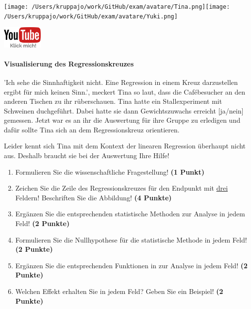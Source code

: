 \documentclass[a4paper, 9pt]{scrartcl}\usepackage[]{graphicx}\usepackage[]{xcolor}
\begin{document}
 
\ifcollection
\begin{flushright}
\tiny\vspace{-3Ex}
\textbf{\examinhaltstart}
\exammodulebiostat
\vspace{-4Ex}
\end{flushright}
\begin{minipage}[t]{0.5\textwidth}
\texttt{[image: /Users/kruppajo/work/GitHub/exam/avatare/Tina.png]}\hspace{-4mm}\texttt{[image: /Users/kruppajo/work/GitHub/exam/avatare/Yuki.png]}
\end{minipage}
\begin{minipage}[t]{0.5\textwidth}
\hfill
\href{https://youtu.be/kHmfEmU6lrk}{\includegraphics[width = 2cm]{img/youtube}}
\end{minipage}
\fi



\ifcollection
\paragraph{Visualisierung des Regressionskreuzes}
\fi

'Ich sehe die Sinnhaftigkeit nicht. Eine Regression in einem Kreuz darzustellen ergibt für mich keinen Sinn.', meckert Tina so laut, dass die Cafébesucher an den anderen Tischen zu ihr rüberschauen. Tina hatte ein Stallexperiment mit Schweinen duchgeführt. Dabei hatte sie dann Gewichtszuwachs erreicht [ja/nein] gemessen. Jetzt war es an ihr die Auswertung für ihre Gruppe zu erledigen und dafür sollte Tina sich an dem Regressionskreuz orientieren.

\vspace{1Ex}

Leider kennt sich Tina mit dem Kontext der linearen Regression überhaupt nicht aus. Deshalb braucht sie bei der Auswertung Ihre Hilfe!

\begin{enumerate}
  \item Formulieren Sie die wissenschaftliche Fragestellung! \textbf{(1 Punkt)}
\item Zeichen Sie die Zeile des Regressionskreuzes für den Endpunkt mit \underline{drei} Feldern! Beschriften Sie die Abbildung! \textbf{(4 Punkte)}
\item Ergänzen Sie die entsprechenden statistische Methoden zur Analyse in jedem Feld! \textbf{(2 Punkte)}
\item Formulieren Sie die Nullhypothese für die statistische Methode in jedem Feld! \textbf{(2 Punkte)}
\item Ergänzen Sie die entsprechenden Funktionen in \Rlogo zur Analyse in jedem Feld! \textbf{(2 Punkte)}
\item Welchen Effekt erhalten Sie in jedem Feld? Geben Sie ein Beispiel! \textbf{(2 Punkte)}
\end{enumerate} 
\clearpage
\end{document}
